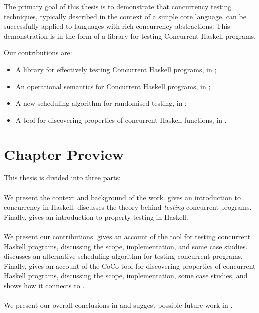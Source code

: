 The primary goal of this thesis is to demonstrate that concurrency
testing techniques, typically described in the context of a simple
core language, can be successfully applied to languages with rich
concurrency abstractions.  This demonstration is in the form of a
library for testing Concurrent Haskell programs.

Our contributions are:

\begin{itemize}
\item A library for effectively testing Concurrent Haskell programs,
  in ;
\item An operational semantics for Concurrent Haskell programs, in
  ;
\item A new scheduling algorithm for randomised testing, in
  ;
\item A tool for discovering properties of concurrent Haskell
  functions, in .
\end{itemize}

\section{Chapter Preview}
\label{sec:intro-roadmap}

This thesis is divided into three parts:

\paragraph{}
We present the context and background of the work.
 gives an introduction to concurrency in
Haskell.   discusses the theory behind \emph{testing}
concurrent programs.  Finally,  gives an
introduction to property testing in Haskell.

\paragraph{}
We present our contributions.   gives an account of
the \dejafu{} tool for testing concurrent Haskell programs, discussing
the scope, implementation, and some case studies.
 discusses an alternative scheduling algorithm
for testing concurrent programs.  Finally,  gives an
account of the CoCo tool for discovering properties of concurrent
Haskell programs, discussing the scope, implementation, some case
studies, and shows how it connects to \dejafu{}.

\paragraph{}
We present our overall conclusions in  and
suggest possible future work in .

